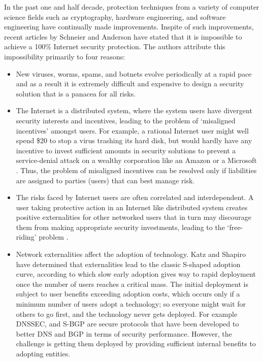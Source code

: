 \documentclass[letterpaper,12pt, onecolumn, nodraft]{IEEEtran}
\begin{document}
In the past one and half decade, protection techniques from a variety of computer science fields such as cryptography, hardware engineering, and software engineering have continually made improvements. Inspite of such improvements, recent articles by Schneier \cite{sch} and Anderson \cite{ranr}\cite{amr} have stated that it is impossible to achieve a 100\% Internet security protection. The authors attribute this impossibility primarily to four reasons: 
\begin{itemize}
\item New viruses, worms, spams, and botnets evolve periodically at a rapid pace and as a result it is extremely difficult and expensive to design a security solution that is a panacea for all risks.
\item The Internet is a distributed system, where the system users have divergent security interests and incentives, leading to the problem of `misaligned incentives' amongst users. For example, a rational Internet user might well spend \$20 to stop a virus trashing its hard disk, but would hardly have any incentive to invest sufficient amounts in security solutions to prevent a service-denial attack on a wealthy corporation like an Amazon or a Microsoft \cite{varian}. Thus, the problem of misaligned incentives can be resolved only if liabilities are assigned to parties (users) that can best manage risk. 
\item The risks faced by Internet users are often correlated and interdependent. A user taking protective action in an Internet like distributed system creates positive externalities \cite{hh} for other networked users that in turn may discourage them from making appropriate security investments, leading to the `free-riding' problem \cite{gccr}\cite{jaw}\cite{mybm}\cite{oom}. 
\item Network externalities affect the adoption of technology. Katz and Shapiro \cite{kschr} have determined that externalities lead to the classic S-shaped adoption curve, according to which slow early adoption gives way to rapid deployment once the number of users reaches a critical mass. The initial deployment is subject to user benefits exceeding adoption costs, which occurs only if a minimum number of users adopt a technology; so everyone might wait for others to go first, and the technology never gets deployed. For example DNSSEC, and S-BGP are secure protocols that have been developed to better DNS and BGP in terms of security performance. However, the challenge is getting them deployed by providing sufficient internal benefits to adopting entities.
\end{itemize}
\end{document}
